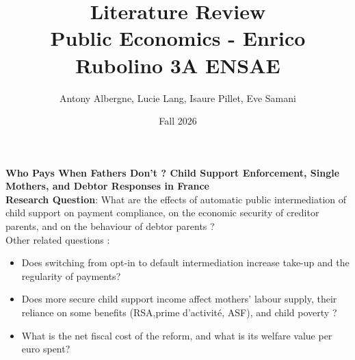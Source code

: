 \documentclass{article}
\title{\textbf{\Large Literature Review}
    \\{\large Public Economics - Enrico Rubolino 3A ENSAE}
}
\author{Antony Albergne, Lucie Lang, Isaure Pillet, Eve Samani}
\date{Fall 2026}
\begin{document}
\maketitle

{\Large \textbf{Who Pays When Fathers Don’t ? Child Support Enforcement, Single Mothers, and Debtor Responses in France}}\\

\noindent \textbf{Research Question}: What are the effects of automatic public intermediation of child support on payment compliance, on the economic security of creditor parents, and on the behaviour of debtor parents ? \\

\noindent Other related questions :
\begin{itemize}
    \item Does switching from opt-in to default intermediation increase take-up and the regularity of payments?
    \item Does more secure child support income affect mothers’ labour supply, their reliance on some benefits (RSA,prime d’activité, ASF), and child poverty ? 
    \item What is the net fiscal cost of the reform, and what is its welfare value per euro spent?
\end{itemize}
\end{document}
